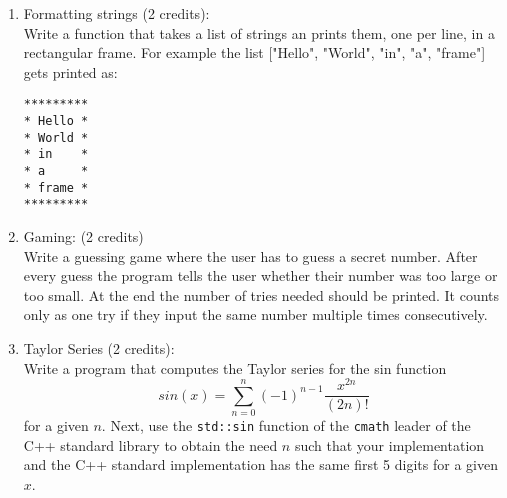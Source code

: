 \documentclass[11pt]{article}
\begin{document}
\begin{enumerate}

\item
Formatting strings (2 credits): \\
Write a function that takes a list of strings an prints them, one per line, in a rectangular frame. For example the list ["Hello", "World", "in", "a", "frame"] gets printed as:
\begin{lstlisting}
********* 
* Hello * 
* World * 
* in    * 
* a     *
* frame *
*********
\end{lstlisting}



\item Gaming: (2 credits)\\
Write a guessing game where the user has to guess a secret number. After every guess the program tells the user whether their number was too large or too small. At the end the number of tries needed should be printed. It counts only as one try if they input the same number multiple times consecutively.

\item Taylor Series (2 credits): \\
Write a program that computes the Taylor series for the sin function
$$
sin(x) = \sum\limits_{n=0}^n (-1)^{n-1} \frac{x^{2n}}{(2n)!} 
$$
for a given $n$. Next, use the \lstinline|std::sin| function of the \lstinline|cmath| leader of the C++ standard library to obtain the need $n$ such that your implementation and the C++ standard implementation has the same first 5 digits for a given $x$.



\end{enumerate}

\doclicenseThis 
\end{document}
